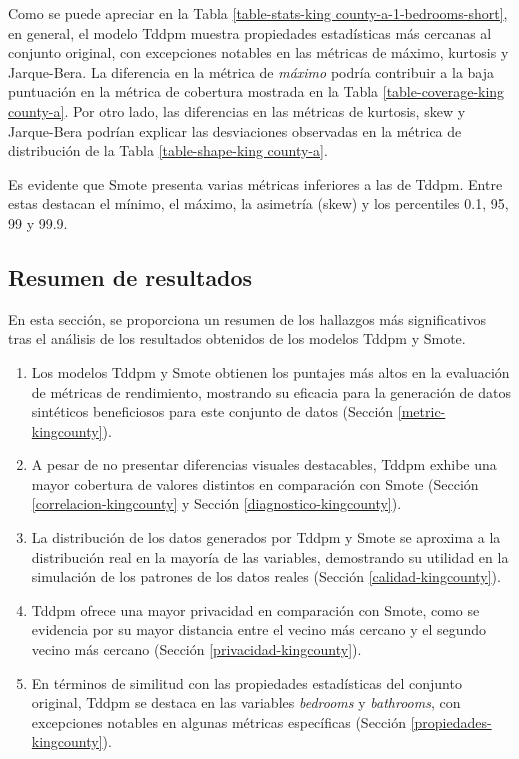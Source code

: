 Como se puede apreciar en la Tabla \ref{table-stats-king county-a-1-bedrooms-short}, en general, el modelo Tddpm muestra propiedades estadísticas más cercanas al conjunto original, con excepciones notables en las métricas de máximo, kurtosis y Jarque-Bera. La diferencia en la métrica de \emph{máximo} podría contribuir a la baja puntuación en la métrica de cobertura mostrada en la Tabla \ref{table-coverage-king county-a}. Por otro lado, las diferencias en las métricas de kurtosis, skew y Jarque-Bera podrían explicar las desviaciones observadas en la métrica de distribución de la Tabla \ref{table-shape-king county-a}.

\newpage
Es evidente que Smote presenta varias métricas inferiores a las de Tddpm. Entre estas destacan el mínimo, el máximo, la asimetría (skew) y los percentiles 0.1, 95, 99 y 99.9.


\subsection{Resumen de resultados}
En esta sección, se proporciona un resumen de los hallazgos más significativos tras el análisis de los resultados obtenidos de los modelos Tddpm y Smote.

\begin{enumerate}
    \item Los modelos Tddpm y Smote obtienen los puntajes más altos en la evaluación de métricas de rendimiento, mostrando su eficacia para la generación de datos sintéticos beneficiosos para este conjunto de datos (Sección \ref{metric-kingcounty}).
    \item A pesar de no presentar diferencias visuales destacables, Tddpm exhibe una mayor cobertura de valores distintos en comparación con Smote (Sección \ref{correlacion-kingcounty} y Sección \ref{diagnostico-kingcounty}).
    \item La distribución de los datos generados por Tddpm y Smote se aproxima a la distribución real en la mayoría de las variables, demostrando su utilidad en la simulación de los patrones de los datos reales (Sección \ref{calidad-kingcounty}).
    \item Tddpm ofrece una mayor privacidad en comparación con Smote, como se evidencia por su mayor distancia entre el vecino más cercano y el segundo vecino más cercano (Sección \ref{privacidad-kingcounty}).
    \item En términos de similitud con las propiedades estadísticas del conjunto original, Tddpm se destaca en las variables \emph{bedrooms} y \emph{bathrooms}, con excepciones notables en algunas métricas específicas (Sección \ref{propiedades-kingcounty}).
\end{enumerate}





